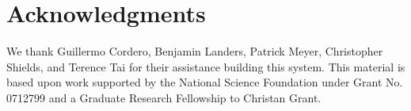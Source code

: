 \documentclass{sig-alternate}
\begin{document}

















\section{Acknowledgments}

We thank Guillermo Cordero, Benjamin Landers, Patrick Meyer, Christopher Shields, and Terence Tai for their assistance building this system. This material is based upon work supported by the National Science Foundation under Grant No. 0712799 and a Graduate Research Fellowship to Christan Grant.


  
\end{document}
